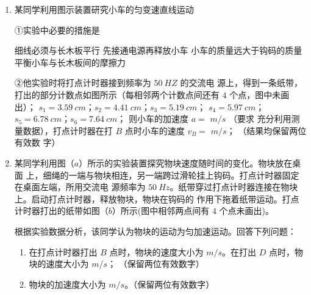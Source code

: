 \begin{enumerate}
\begin{enumerate}
\end{enumerate}

\banswer{

}


\newpage
\item 
{}
某同学利用图示装置研究小车的匀变速直线运动
\begin{figure}[h!]
\centering

\end{figure}

①实验中必要的措施是  

\fourchoices
{细线必须与长木板平行}
{先接通电源再释放小车}
{小车的质量远大于钩码的质量}
{平衡小车与长木板间的摩擦力}

②他实验时将打点计时器接到频率为 $ 50 \ HZ $ 的交流电
源上，得到一条纸带，打出的部分计数点如图所示（每相邻两个计数点间还有 $ 4 $ 个点，图中未画出）；
$ s_{1}=3.59 \ cm $；$ s_{2}=4.41 \ cm $；$ s_{3}=5.19 \ cm $；
$ s_4=5.97 \ cm $；$ s_5=6.78 \ cm $；$ s_6=7.64 \ cm $；
则小车的加速度 $ a= $
$ m/s $ （要求
充分利用测量数据），打点计时器在打 $ B $ 点时小车的速度 $ v_{B} = $
$ m/s $；
（结果均保留两位有效数
字）
\begin{figure}[h!]
\centering

\end{figure}





\item 
{}
某同学利用图（$ a $）所示的实验装置探究物块速度随时间的变化。物块放在桌面
上，细绳的一端与物块相连，另一端跨过滑轮挂上钩码。打点计时器固定在桌面左端，所用交流电
源频率为 $ 50 \ Hz $。纸带穿过打点计时器连接在物块上。启动打点计时器，释放物块，物块在钩码的
作用下拖着纸带运动。打点计时器打出的纸带如图（$ b $）所示(图中相邻两点间有 $ 4 $ 个点未画出)。
\begin{figure}[h!]
\centering

\end{figure}




根据实验数据分析，该同学认为物块的运动为匀加速运动。回答下列问题：
\begin{enumerate}
\renewcommand{\labelenumi}{\arabic{enumi}.}
\item
在打点计时器打出 $ B $ 点时，物块的速度大小为  $ m/s $。在打出 $ D $ 点时，物块的速度大小为  
$ m/s $；
（保留两位有效数字）
\item 
物块的加速度大小为  $ m/s $。（保留两位有效数字）





\end{enumerate}
\end{enumerate}
